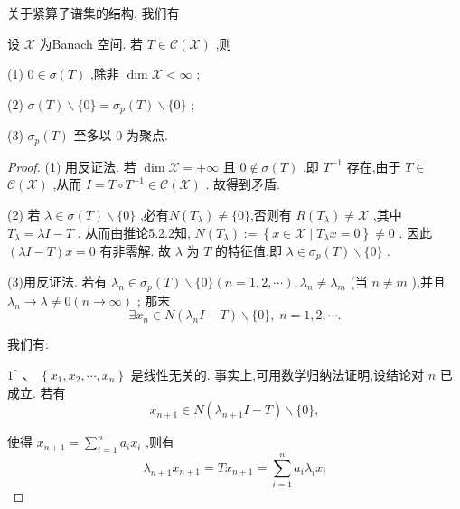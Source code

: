 \documentclass[lang=cn,newtx,10pt,scheme=chinese,thmcnt=chapter]{elegantbook}
\begin{document}
关于紧算子谱集的结构, 我们有
\begin{theorem}
    设 \(\mathcal{X}\) 为Banach 空间. 若 \(T \in  \mathcal{C}\left( \mathcal{X}\right)\) ,则

(1) \(0 \in  \sigma \left( T\right)\) ,除非 \(\dim \mathcal{X} < \infty\) ;

(2) \(\sigma \left( T\right)  \smallsetminus  \{ 0\}  = {\sigma }_{p}\left( T\right)  \smallsetminus  \{ 0\}\) ;

(3) \({\sigma }_{p}\left( T\right)\) 至多以 0 为聚点.
\end{theorem}
\begin{proof}
    (1) 用反证法. 若 \(\dim \mathcal{X} =  + \infty\) 且 \(0 \notin  \sigma \left( T\right)\) ,即 \({T}^{-1}\) 存在,由于 \(T \in\)  \(\mathcal{C}\left( \mathcal{X}\right)\) ,从而 \(I = T \circ  {T}^{-1} \in  \mathcal{C}\left( \mathcal{X}\right)\) . 故得到矛盾.

(2) 若 \(\lambda  \in  \sigma \left( T\right)  \smallsetminus  \{ 0\}\) ,必有$N(T_\lambda )\neq \{0\}$,否则有 \(R\left( {T}_{\lambda }\right)  \neq  \mathcal{X}\) ,其中 \({T}_{\lambda } = {\lambda I} - T\) . 从而由推论5.2.2知, \(N\left( {T}_{\lambda }\right)  \mathrel{\text{ := }} \left\{  {x \in  \mathcal{X} \mid  {T}_{\lambda }x = 0}\right\}   \neq  0\) . 因此 \(\left( {{\lambda I} - T}\right) x = 0\) 有非零解. 故 \(\lambda\) 为 \(T\) 的特征值,即 \(\lambda  \in  {\sigma }_{p}\left( T\right)  \smallsetminus  \{ 0\}\) .

(3)用反证法. 若有 \({\lambda }_{n} \in  {\sigma }_{p}\left( T\right)  \smallsetminus  \{ 0\} \left( {n = 1,2,\cdots }\right) ,{\lambda }_{n} \neq  {\lambda }_{m}\) (当 \(n \neq  m\) ),并且 \({\lambda }_{n} \rightarrow  \lambda  \neq  0\left( {n \rightarrow  \infty }\right)\) ; 那末
\begin{equation*}
\exists {x}_{n} \in  N\left( {{\lambda }_{n}I - T}\right)  \smallsetminus  \{ 0\} ,\;n = 1,2,\cdots .
\end{equation*}

我们有:

\({1}^{ \circ  }\text{ 、 }\left\{  {{x}_{1},{x}_{2},\cdots ,{x}_{n}}\right\}\) 是线性无关的. 事实上,可用数学归纳法证明,设结论对 \(n\) 已成立. 若有
\begin{equation*}
{x}_{n + 1} \in  N\left( {{\lambda }_{n + 1}I - T}\right)  \smallsetminus  \{ 0\} ,
\end{equation*}

使得 \({x}_{n + 1} = \mathop{\sum }\limits_{{i = 1}}^{n}{a}_{i}{x}_{i}\) ,则有
\begin{equation*}
{\lambda }_{n + 1}{x}_{n + 1} = T{x}_{n + 1} = \mathop{\sum }\limits_{{i = 1}}^{n}{a}_{i}{\lambda }_{i}{x}_{i}
\end{equation*}


\end{proof}
\end{document}
